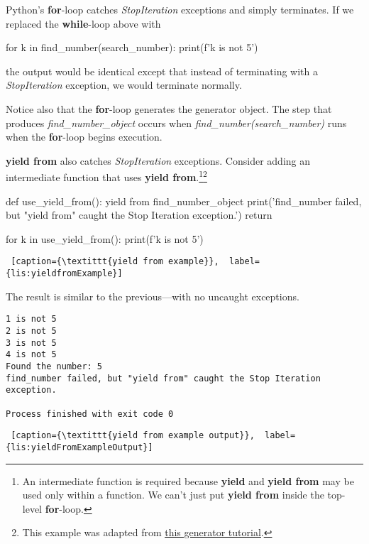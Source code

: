 Python's \textbf{for}-loop catches \textit{StopIteration} exceptions and simply terminates. If we replaced the \textbf{while}-loop above with 
\begin{python}
for k in find_number(search_number):
    print(f'{k} is not 5')
\end{python}
the output would be identical except that instead of terminating with a \textit{StopIteration} exception, we would terminate normally.

Notice also that the \textbf{for}-loop generates the generator object. The step that produces \textit{find\_number\_object} occurs when \textit{find\_number(search\_number)} runs when the  \textbf{for}-loop begins execution.

\textbf{yield from} also catches \textit{StopIteration} exceptions. Consider adding an intermediate function that uses \textbf{yield from}.\footnote{An intermediate function is required because \textbf{yield} and \textbf{yield from} may be used only within a function. We can't just put \textbf{yield from} inside the top-level \textbf{for}-loop.}\footnote{This example was adapted from \href{https://www.python-course.eu/python3_generators.php}{\underline{this generator tutorial}}.} 

\begin{minipage}{\linewidth}  \largev  \hrulefill  
\begin{python}
def use_yield_from():
    yield from find_number_object
    print('find_number failed, but "yield from" caught the Stop Iteration exception.')
    return

for k in use_yield_from():
    print(f'{k} is not 5')
\end{python}
\begin{lstlisting} [caption={\textittt{yield from example}},  label={lis:yieldfromExample}]
\end{lstlisting}
\end{minipage}
The result is similar to the previous---with no uncaught exceptions. 

\begin{minipage}{\linewidth}  \largev  \hrulefill  
\begin{verbatim}
1 is not 5
2 is not 5
3 is not 5
4 is not 5
Found the number: 5
find_number failed, but "yield from" caught the Stop Iteration exception.

Process finished with exit code 0
\end{verbatim}
\begin{lstlisting} [caption={\textittt{yield from example output}},  label={lis:yieldFromExampleOutput}]
\end{lstlisting}
\end{minipage}

